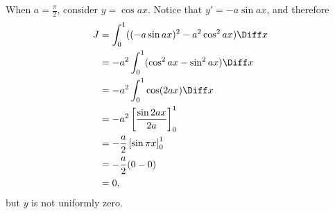 \begin{enumerate}
          When \(a = \frac{\pi}{2}\), consider \(y = \cos ax\). Notice that \(y' = - a \sin ax\), and therefore
          \begin{align*}
              J & = \int_{0}^{1} ((-a \sin ax)^2 - a^2 \cos^2 ax) \Diff x \\
                & = -a^2 \int_{0}^{1} (\cos^2 ax - \sin^2 ax) \Diff x     \\
                & = -a^2 \int_{0}^{1} \cos(2ax) \Diff x                   \\
                & = -a^2 \left[\frac{\sin 2ax}{2a}\right]_{0}^{1}         \\
                & = -\frac{a}{2} \left[\sin \pi x\right]_{0}^{1}          \\
                & = -\frac{a}{2} (0 - 0)                                  \\
                & = 0,
          \end{align*}
          but \(y\) is not uniformly zero.
\end{enumerate}
